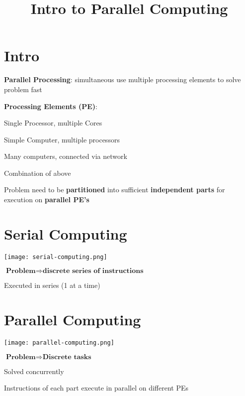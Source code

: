 \documentclass[12pt]{article}
\title{\textbf{ Intro to Parallel Computing }}
\date{}
\begin{document}
\maketitle

\begin{spacing}{1.5}

\section{Intro}

\begin{itemize*}
	\item \textbf{Parallel Processing}: simultaneous use multiple processing elements to solve problem fast
	\item \textbf{Processing Elements (PE)}:
		\begin{itemize*}
			\item Single Processor, multiple Cores
			\item Simple Computer, multiple processors
			\item Many computers, connected via network
			\item Combination of above 
		\end{itemize*}
	\item Problem need to be \textbf{partitioned} into sufficient \textbf{independent parts} for execution on \textbf{parallel PE's}
\end{itemize*}

\section{Serial Computing}

\texttt{[image: serial-computing.png]}

\begin{itemize*}
	\item $\textbf{Problem} \Rightarrow \textbf{discrete series of instructions}$
	\item Executed in series (1 at a time)
\end{itemize*}

\section{Parallel Computing}

\texttt{[image: parallel-computing.png]}

\begin{itemize*}
	\item $\textbf{Problem} \Rightarrow \textbf{Discrete tasks}$
	\item Solved concurrently
	\item Instructions of each part execute in parallel on different PEs
\end{itemize*}


\end{spacing}
\end{document}
